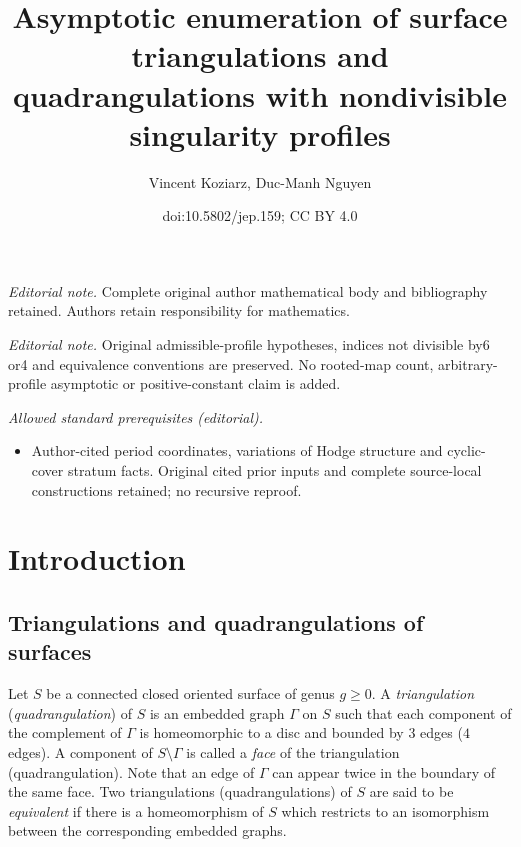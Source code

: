 \documentclass[10pt]{amsart}
\title{Asymptotic enumeration of surface triangulations and quadrangulations with nondivisible singularity profiles}
\author{Vincent Koziarz, Duc-Manh Nguyen}
\date{doi:10.5802/jep.159; CC BY 4.0}
\theoremstyle{plain}
\theoremstyle{definition}
\let\G\Gamma
\begin{document}
\maketitle
\noindent\textit{Editorial note.} Complete original author mathematical body and bibliography retained. Authors retain responsibility for mathematics.\par\medskip
\noindent\textit{Editorial note.} Original admissible-profile hypotheses, indices not divisible by6 or4 and equivalence conventions are preserved. No rooted-map count, arbitrary-profile asymptotic or positive-constant claim is added.\par\medskip
\noindent\textit{Allowed standard prerequisites (editorial).}\begin{itemize}
\item Author-cited period coordinates, variations of Hodge structure and cyclic-cover stratum facts. Original cited prior inputs and complete source-local constructions retained; no recursive reproof.
\end{itemize}\medskip
\section{Introduction}\label{sec:intro}
\subsection{Triangulations and quadrangulations of surfaces}\label{sec:triang:quad}
Let $S$ be a connected closed oriented surface of genus $g \geq 0$. A \emph{triangulation} (\resp \emph{quadrangulation}) of $S$ is an embedded graph $\G$ on $S$ such that each component of the complement of $\G$ is homeomorphic to a disc and bounded by $3$ edges (\resp $4$ edges). A component of $S\setminus \G$ is called a \emph{face} of the triangulation (\resp quadrangulation). Note that an edge of $\G$ can appear twice in the boundary of the same face. Two triangulations (\resp quadrangulations) of $S$ are said to be \emph{equivalent} if there is a homeomorphism of $S$ which restricts to an isomorphism between the corresponding embedded graphs.
\end{document}
